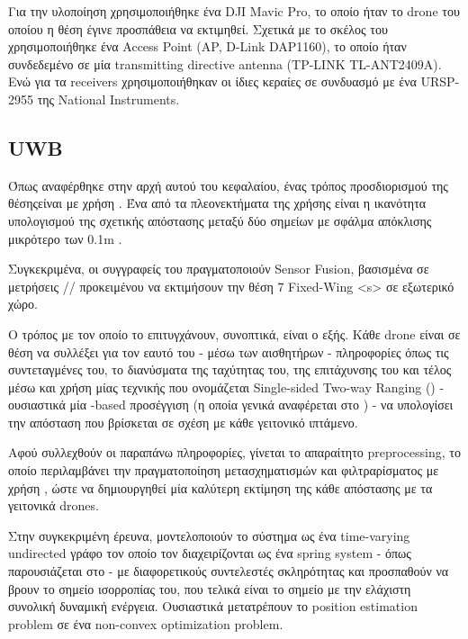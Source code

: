 Για την υλοποίηση χρησιμοποιήθηκε ένα DJI Mavic Pro, το οποίο ήταν το drone του οποίου η θέση έγινε προσπάθεια να εκτιμηθεί.
Σχετικά με το σκέλος του  χρησιμοποιήθηκε ένα Access Point (AP, D-Link DAP1160), το οποίο ήταν συ\-νδε\-δε\-μέ\-νο 
σε μία transmitting directive antenna (TP-LINK TL-ANT2409A). Ενώ για τα receivers χρησιμοποιήθηκαν οι ίδιες κεραίες σε συνδυασμό 
με ένα URSP-2955 της National Instruments.

\subsection{UWB}
Όπως αναφέρθηκε στην αρχή αυτού του κεφαλαίου, ένας τρόπος προσδιορισμού της θέσης\udot είναι με χρήση .
Ένα από τα πλεονεκτήματα της χρήσης  είναι η ικανότητα υπολογισμού της σχετικής απόστασης μεταξύ δύο
σημείων με σφάλμα απόκλισης μικρότερο των 0.1m \cite{uwb-accuracy}.

Συγκεκριμένα, οι συγγραφείς του \cite{uwb-imu-gps1} πραγματοποιούν Sensor Fusion, βασισμένα σε μετρήσεις 
// προκειμένου να εκτιμήσουν την θέση 
7 Fixed-Wing <s> σε εξωτερικό χώρο.

Ο τρόπος με τον οποίο το επιτυγχάνουν, συνοπτικά, είναι ο εξής. Κάθε drone είναι σε θέση να συλλέξει για τον εαυτό του 
- μέσω των αισθητήρων - πληροφορίες όπως τις συντεταγμένες του, το διανύσματα της ταχύτητας του, της
επιτάχυνσης του και τέλος μέσω \udot και χρήση μίας τεχνικής που ονομάζεται Single-sided Two-way Ranging 
() - ουσιαστικά μία -based προσέγγιση (η οποία γενικά αναφέρεται 
στο ) - να υπολογίσει την απόσταση που βρίσκεται σε σχέση με κάθε γειτονικό ιπτάμενο.

Αφού συλλεχθούν οι παραπάνω πληροφορίες, γίνεται το απαραίτητο preprocessing, το οποίο περιλαμβάνει την πραγματοποίηση μετασχηματισμών
και φιλτραρίσματος με χρήση , ώστε να δημιουργηθεί μία καλύτερη εκτίμηση της κάθε απόστασης με τα γειτονικά drones.

Στην συγκεκριμένη έρευνα, μοντελοποιούν το σύστημα ως ένα time-varying undirected γράφο τον οποίο τον διαχειρίζονται ως ένα spring system - 
όπως παρουσιάζεται στο  - με διαφορετικούς συντελεστές σκληρότητας και προσπαθούν να βρουν το σημείο ισορροπίας του, 
που τελικά είναι το σημείο με την ελάχιστη συνολική δυναμική ενέργεια. Ουσιαστικά μετατρέπουν το position estimation problem σε ένα 
non-convex optimization problem.

